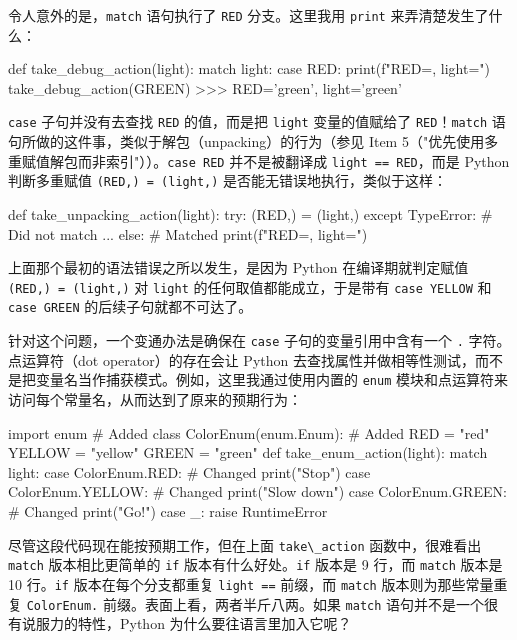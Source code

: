 令人意外的是，\verb|match| 语句执行了 \verb|RED| 分支。这里我用 \verb|print| 来弄清楚发生了什么：

\begin{codebox}[python]
def take_debug_action(light):
    match light:
        case RED:
            print(f"{RED=}, {light=}")
take_debug_action(GREEN)
>>>
RED='green', light='green'
\end{codebox}

\verb|case| 子句并没有去查找 \verb|RED| 的值，而是把 \verb|light| 变量的值赋给了 \verb|RED|！\verb|match| 语句所做的这件事，类似于解包（unpacking）的行为（参见 Item 5（"优先使用多重赋值解包而非索引"））。\verb|case RED| 并不是被翻译成 \verb|light == RED|，而是 Python 判断多重赋值 \verb|(RED,) = (light,)| 是否能无错误地执行，类似于这样：

\begin{codebox}[python]
def take_unpacking_action(light):
    try:
        (RED,) = (light,)
    except TypeError:
        # Did not match
        ...
    else:
        # Matched
        print(f"{RED=}, {light=}")
\end{codebox}

上面那个最初的语法错误之所以发生，是因为 Python 在编译期就判定赋值 \verb|(RED,) = (light,)| 对 \verb|light| 的任何取值都能成立，于是带有 \verb|case YELLOW| 和 \verb|case GREEN| 的后续子句就都不可达了。

针对这个问题，一个变通办法是确保在 \verb|case| 子句的变量引用中含有一个 \verb|.| 字符。点运算符（dot operator）的存在会让 Python 去查找属性并做相等性测试，而不是把变量名当作捕获模式。例如，这里我通过使用内置的 \verb|enum| 模块和点运算符来访问每个常量名，从而达到了原来的预期行为：

\begin{codebox}[python]
import enum                     # Added
class ColorEnum(enum.Enum):     # Added
    RED = "red"
    YELLOW = "yellow"
    GREEN = "green"
def take_enum_action(light):
    match light:
        case ColorEnum.RED:     # Changed
            print("Stop")
        case ColorEnum.YELLOW:  # Changed
            print("Slow down")
        case ColorEnum.GREEN:   # Changed
            print("Go!")
        case _:
            raise RuntimeError
\end{codebox}

尽管这段代码现在能按预期工作，但在上面 \verb|take\_action| 函数中，很难看出 \verb|match| 版本相比更简单的 \verb|if| 版本有什么好处。\verb|if| 版本是 9 行，而 \verb|match| 版本是 10 行。\verb|if| 版本在每个分支都重复 \verb|light ==| 前缀，而 \verb|match| 版本则为那些常量重复 \verb|ColorEnum.| 前缀。表面上看，两者半斤八两。如果 \verb|match| 语句并不是一个很有说服力的特性，Python 为什么要往语言里加入它呢？

